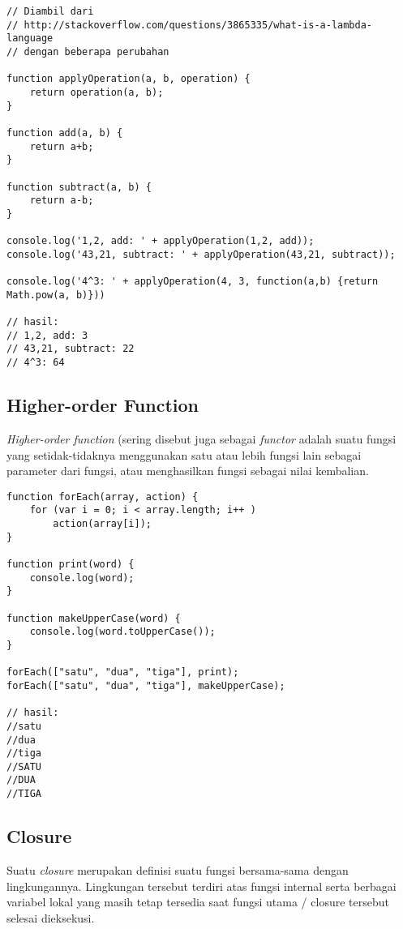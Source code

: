 \lstset{language=JavaScript,caption=Ekspresi Lambda di JavaScript}
\begin{lstlisting}
// Diambil dari 
// http://stackoverflow.com/questions/3865335/what-is-a-lambda-language
// dengan beberapa perubahan

function applyOperation(a, b, operation) {
	return operation(a, b);
}

function add(a, b) {
	return a+b;
}

function subtract(a, b) {
	return a-b;
}

console.log('1,2, add: ' + applyOperation(1,2, add));
console.log('43,21, subtract: ' + applyOperation(43,21, subtract));

console.log('4^3: ' + applyOperation(4, 3, function(a,b) {return Math.pow(a, b)}))

// hasil:
// 1,2, add: 3
// 43,21, subtract: 22
// 4^3: 64
\end{lstlisting}

\subsection{Higher-order Function}

\textit{Higher-order function} (sering disebut juga sebagai \textit{functor} adalah suatu fungsi yang setidak-tidaknya menggunakan satu atau lebih fungsi lain sebagai parameter dari fungsi, atau menghasilkan fungsi sebagai nilai kembalian. 

\lstset{language=JavaScript,caption=Higher-order Function di JavaScript}
\begin{lstlisting}
function forEach(array, action) {
	for (var i = 0; i < array.length; i++ )
		action(array[i]);
}

function print(word) {
	console.log(word);
}

function makeUpperCase(word) {
	console.log(word.toUpperCase());
}

forEach(["satu", "dua", "tiga"], print);
forEach(["satu", "dua", "tiga"], makeUpperCase);

// hasil:
//satu
//dua
//tiga
//SATU
//DUA
//TIGA
\end{lstlisting}

\subsection{Closure}

Suatu \textit{closure} merupakan definisi suatu fungsi bersama-sama dengan lingkungannya. Lingkungan tersebut terdiri atas fungsi internal serta berbagai variabel lokal yang masih tetap tersedia saat fungsi utama / closure tersebut selesai dieksekusi. 

